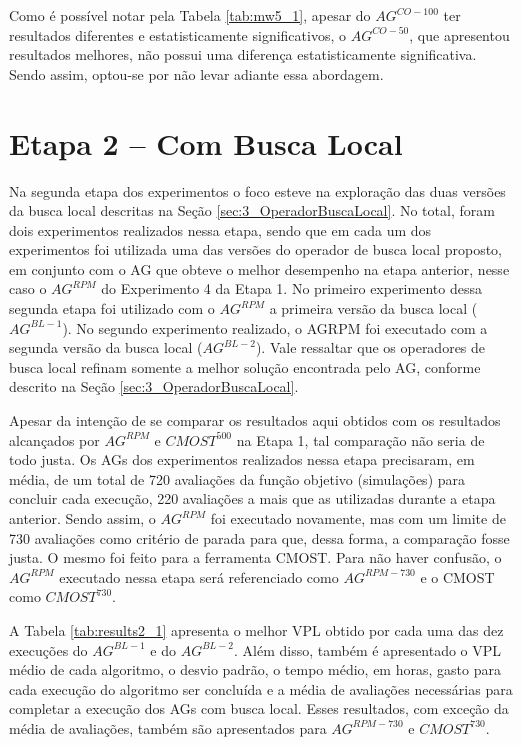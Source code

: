 Como é possível notar pela Tabela \ref{tab:mw5_1}, apesar do $AG^{CO-{100}}$ ter resultados diferentes e estatisticamente significativos, o $AG^{CO-{50}}$, que apresentou resultados melhores, não possui uma diferença estatisticamente significativa. Sendo assim, optou-se por não levar adiante essa abordagem.

\section{Etapa 2 – Com Busca Local}
\label{ch:5_Etapa2}
Na segunda etapa dos experimentos o foco esteve na exploração das duas versões da busca local descritas na Seção \ref{sec:3_OperadorBuscaLocal}. No total, foram dois experimentos realizados nessa etapa, sendo que em cada um dos experimentos foi utilizada uma das versões do operador de busca local proposto, em conjunto com o AG que obteve o melhor desempenho na etapa anterior, nesse caso o $AG^{RPM}$ do Experimento 4 da Etapa 1. No primeiro experimento dessa segunda etapa foi utilizado com o $AG^{RPM}$ a primeira versão da busca local ($AG^{BL-1}$). No segundo experimento realizado, o AGRPM foi executado com a segunda versão da busca local ($AG^{BL-2}$). Vale ressaltar que os operadores de busca local refinam somente a melhor solução encontrada pelo AG, conforme descrito na Seção \ref{sec:3_OperadorBuscaLocal}.

Apesar da intenção de se comparar os resultados aqui obtidos com os resultados alcançados por $AG^{RPM}$ e  $CMOST^{500}$ na Etapa 1, tal comparação não seria de todo justa. Os AGs dos experimentos realizados nessa etapa precisaram, em média, de um total de 720 avaliações da função objetivo (simulações) para concluir cada execução, 220 avaliações a mais que as utilizadas durante a etapa anterior. Sendo assim, o $AG^{RPM}$ foi executado novamente, mas com um limite de 730 avaliações como critério de parada para que, dessa forma, a comparação fosse justa. O mesmo foi feito para a ferramenta CMOST. Para não haver confusão, o $AG^{RPM}$ executado nessa etapa será referenciado como $AG^{RPM-730}$ e o CMOST como $CMOST^{730}$. 

A Tabela \ref{tab:results2_1} apresenta o melhor VPL obtido por cada uma das dez execuções do $AG^{BL-1}$ e do $AG^{BL-2}$. Além disso, também é apresentado o VPL médio de cada algoritmo, o desvio padrão, o tempo médio, em horas, gasto para cada execução do algoritmo ser concluída e a média de avaliações necessárias para completar a execução dos AGs com busca local. Esses resultados, com exceção da média de avaliações, também são apresentados para $AG^{RPM-730}$ e $CMOST^{730}$.

